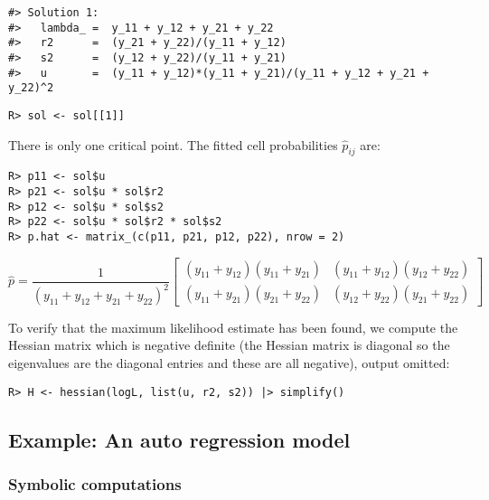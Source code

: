 \begin{verbatim}
#> Solution 1:
#>   lambda_ =  y_11 + y_12 + y_21 + y_22 
#>   r2      =  (y_21 + y_22)/(y_11 + y_12) 
#>   s2      =  (y_12 + y_22)/(y_11 + y_21) 
#>   u       =  (y_11 + y_12)*(y_11 + y_21)/(y_11 + y_12 + y_21 + y_22)^2
\end{verbatim}

\begin{verbatim}
R> sol <- sol[[1]]
\end{verbatim}

There is only one critical point. The fitted cell probabilities \(\hat p_{ij}\) are:

\begin{verbatim}
R> p11 <- sol$u
R> p21 <- sol$u * sol$r2
R> p12 <- sol$u * sol$s2
R> p22 <- sol$u * sol$r2 * sol$s2
R> p.hat <- matrix_(c(p11, p21, p12, p22), nrow = 2)
\end{verbatim}

\begin{equation}
\hat p = \frac{1}{\left(y_{11} + y_{12} + y_{21} + y_{22}\right)^{2}}  \left[\begin{matrix}\left(y_{11} + y_{12}\right) \left(y_{11} + y_{21}\right) & \left(y_{11} + y_{12}\right) \left(y_{12} + y_{22}\right)\\\left(y_{11} + y_{21}\right) \left(y_{21} + y_{22}\right) & \left(y_{12} + y_{22}\right) \left(y_{21} + y_{22}\right)\end{matrix}\right]
\end{equation}

To verify that the maximum likelihood estimate has been found, we compute the Hessian matrix
which is negative definite (the Hessian matrix is diagonal so the eigenvalues are the diagonal entries and these are all negative), output omitted:

\begin{verbatim}
R> H <- hessian(logL, list(u, r2, s2)) |> simplify()
\end{verbatim}

\hypertarget{example-an-auto-regression-model}{%
\subsection{Example: An auto regression model}\label{example-an-auto-regression-model}}

\hypertarget{symbolic-computations}{%
\subsubsection{Symbolic computations}\label{symbolic-computations}}

